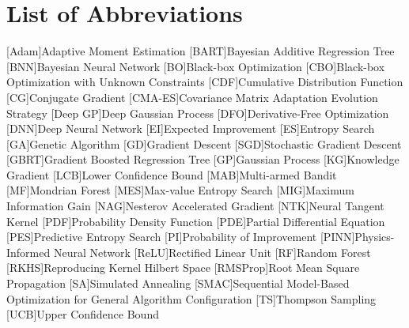 \chapter*{List of Abbreviations}
{}
\begin{acronym}
        [Adam]{Adaptive Moment Estimation}
        [BART]{Bayesian Additive Regression Tree}
        [BNN]{Bayesian Neural Network}
        [BO]{Black-box Optimization}
        [CBO]{Black-box Optimization with Unknown Constraints}
        [CDF]{Cumulative Distribution Function}
        [CG]{Conjugate Gradient}
        [CMA-ES]{Covariance Matrix Adaptation Evolution Strategy}
        [Deep GP]{Deep Gaussian Process}
        [DFO]{Derivative-Free Optimization}
        [DNN]{Deep Neural Network}
        [EI]{Expected Improvement}
        [ES]{Entropy Search}
        [GA]{Genetic Algorithm}
        [GD]{Gradient Descent}
        [SGD]{Stochastic Gradient Descent}
        [GBRT]{Gradient Boosted Regression Tree}
        [GP]{Gaussian Process}
        [KG]{Knowledge Gradient}
        [LCB]{Lower Confidence Bound}
        [MAB]{Multi-armed Bandit}
        [MF]{Mondrian Forest}
        [MES]{Max-value Entropy Search}
        [MIG]{Maximum Information Gain}
        [NAG]{Nesterov Accelerated Gradient}
        [NTK]{Neural Tangent Kernel}
        [PDF]{Probability Density Function}
        [PDE]{Partial Differential Equation}
        [PES]{Predictive Entropy Search}
        [PI]{Probability of Improvement}
        [PINN]{Physics-Informed Neural Network}
        [ReLU]{Rectified Linear Unit}
        [RF]{Random Forest}
        [RKHS]{Reproducing Kernel Hilbert Space}
        [RMSProp]{Root Mean Square Propagation}
        [SA]{Simulated Annealing}
        [SMAC]{Sequential Model-Based Optimization for General Algorithm Configuration}
        [TS]{Thompson Sampling}
        [UCB]{Upper Confidence Bound}
\end{acronym}
